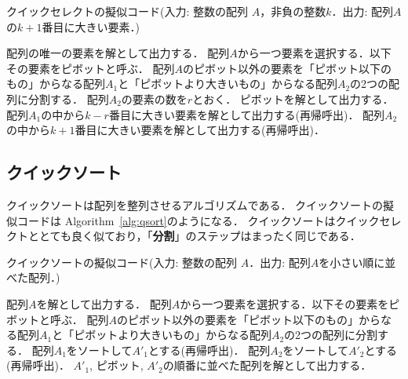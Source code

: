 \documentclass[a4paper,twoside,onecolumn,openany,article]{memoir}
\theoremstyle{remark}
\begin{document}
\begin{algorithm}
\caption{クイックセレクトの擬似コード(入力: 整数の配列 $A$，非負の整数$k$．出力: 配列$A$の$k+1$番目に大きい要素．)}
\label{alg:qselect}
\begin{algorithmic}
  \State 配列の唯一の要素を解として出力する．
\Else
  \State 配列$A$から一つ要素を選択する．以下その要素をピボットと呼ぶ．
  \State 配列$A$のピボット以外の要素を「ピボット以下のもの」からなる配列$A_1$と「ピボットより大きいもの」からなる配列$A_2$の2つの配列に分割する．
  \State 配列$A_2$の要素の数を$r$とおく．
    \State ピボットを解として出力する．
    \State 配列$A_1$の中から$k-r$番目に大きい要素を解として出力する(再帰呼出)．
  \Else
    \State 配列$A_2$の中から$k+1$番目に大きい要素を解として出力する(再帰呼出)．
  \EndIf
\EndIf
\end{algorithmic}
\end{algorithm}


\subsection{クイックソート}
クイックソートは配列を整列させるアルゴリズムである．
クイックソートの擬似コードは Algorithm~\ref{alg:qsort}のようになる．
クイックソートはクイックセレクトととても良く似ており，「\textbf{分割}」のステップはまったく同じである．

\begin{algorithm}
\caption{クイックソートの擬似コード(入力: 整数の配列 $A$．出力: 配列$A$を小さい順に並べた配列．)}
\label{alg:qsort}
\begin{algorithmic}
  \State 配列$A$を解として出力する．
\Else
  \State 配列$A$から一つ要素を選択する．以下その要素をピボットと呼ぶ．
  \State 配列$A$のピボット以外の要素を「ピボット以下のもの」からなる配列$A_1$と「ピボットより大きいもの」からなる配列$A_2$の2つの配列に分割する．
  \State 配列$A_1$をソートして$A'_1$とする(再帰呼出)．
  \State 配列$A_2$をソートして$A'_2$とする(再帰呼出)．
  \State $A'_1$, ピボット, $A'_2$の順番に並べた配列を解として出力する．
\EndIf
\end{algorithmic}
\end{algorithm}
\end{document}
